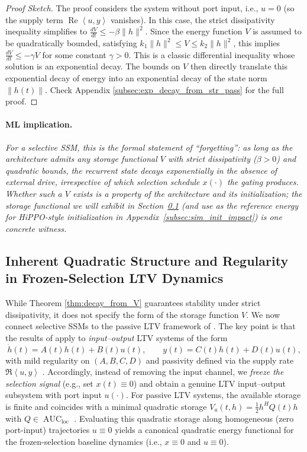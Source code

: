 \documentclass[10pt]{article} %
\newcommand{\loc}{\mathrm{loc}}                         %
\newcommand{\ip}[2]{\left\langle #1, #2 \right\rangle} %
\DeclareMathOperator{\realPart}{Re}                     %
\DeclareMathOperator{\AUC}{AUC}                         %
\theoremstyle{definition}
\begin{document}
\begin{proof}[Proof Sketch]
The proof considers the system without port input, i.e., $u=0$ (so the supply term $\realPart\ip{u}{y}$ vanishes). In this case, the strict dissipativity inequality simplifies to $\frac{dV}{dt} \le -\beta\|h\|^2$. Since the energy function $V$ is assumed to be quadratically bounded, satisfying $k_1\|h\|^2 \le V \le k_2\|h\|^2$, this implies $\frac{dV}{dt} \le -\gamma V$ for some constant $\gamma > 0$. This is a classic differential inequality whose solution is an exponential decay. The bounds on $V$ then directly translate this exponential decay of energy into an exponential decay of the state norm $\|h(t)\|$.
Check Appendix \ref{subsec:exp_decay_from_str_pass} for the full proof.
\end{proof}

\paragraph{ML implication.} \textit{For a selective SSM, this is the formal statement of ``forgetting'': as long as the architecture admits any storage functional $V$ with strict dissipativity ($\beta>0$) and quadratic bounds, the recurrent state decays exponentially in the absence of external drive, irrespective of which selection schedule $x(\cdot)$ the gating produces. Whether such a $V$ exists is a property of the architecture and its initialization; the storage functional we will exhibit in Section~\ref{subsec:auc_loc_subsection} (and use as the reference energy for HiPPO-style initialization in Appendix~\ref{subsec:sim_init_impact}) is one concrete witness.}

\subsection{Inherent Quadratic Structure and Regularity in Frozen-Selection LTV Dynamics}
\label{subsec:auc_loc_subsection}
While Theorem \ref{thm:decay_from_V} guarantees stability under strict dissipativity, it does not specify the form of the storage function $V$.
We now connect selective SSMs to the passive LTV framework of \citet{MorandinHinsen2024}. The key point is that the results of \citet{MorandinHinsen2024} apply to \emph{input--output} LTV systems of the form
\begin{equation}
\dot{h}(t)=A(t)h(t)+B(t)u(t),\qquad y(t)=C(t)h(t)+D(t)u(t),
\end{equation}
with mild regularity on $(A,B,C,D)$ and passivity defined via the supply rate $\Re\ip{u}{y}$ \citep[Eq.~(1), Def.~1.1]{MorandinHinsen2024}.
Accordingly, instead of removing the input channel, we \emph{freeze the selection signal} (e.g., set $x(t)\equiv 0$) and obtain a genuine LTV input--output subsystem with port input $u(\cdot)$.
For passive LTV systems, the available storage is finite and coincides with a minimal quadratic storage $V_a(t,h)=\tfrac{1}{2}h^HQ(t)h$ with $Q\in\AUC_{\loc}$ \citep[Def.~4.1, Cor.~4.3]{MorandinHinsen2024}. Evaluating this quadratic storage along homogeneous (zero port-input) trajectories $u\equiv 0$ yields a canonical quadratic energy functional for the frozen-selection baseline dynamics (i.e., $x\equiv 0$ and $u\equiv 0$).
\end{document}
